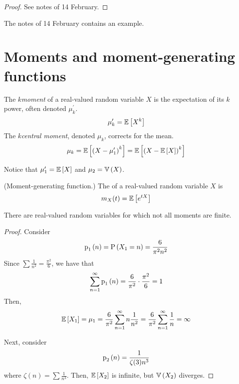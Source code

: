 \documentclass[11pt]{article}
\begin{document}
\begin{proof}
    See notes of 14 February.
\end{proof}

The notes of 14 February contains an example.

\section{Moments and moment-generating functions}

\begin{defn}
    The $k$\th \emph{moment} of a real-valued random variable $X$ is the
    expectation of its $k$\th power, often denoted $\mu_k^\prime$.
    \begin{equation*}
        \mu_k^\prime = \operatorname{\mathbb{E}}{\left[X^k\right]}
    \end{equation*}
    The $k$\th \emph{central moment}, denoted $\mu_k$, corrects for the mean.
    \begin{equation*}
        \mu_k
        = \operatorname{\mathbb{E}}{\left[\left(X - \mu_1^\prime\right)^k\right]}
        = \operatorname{\mathbb{E}}{\left[\left(X - \operatorname{\mathbb{E}}{\left[X\right]}\right)^k\right]}
    \end{equation*}
\end{defn}

\begin{rem}
    Notice that $\mu_1^\prime = \operatorname{\mathbb{E}}{\left[X\right]}$ and $\mu_2 = \operatorname{\mathbb{V}}{\left(X\right)}$.
\end{rem}

\begin{defn}{(Moment-generating function.)}
    The \emph{\mgf} of a real-valued random variable $X$ is
    \begin{equation*}
        m_X(t) = \operatorname{\mathbb{E}}{\left[e^{t X}\right]}
    \end{equation*}
\end{defn}

\begin{rem}
    There are real-valued random variables for which not all moments are
    finite.
\end{rem}

\begin{proof}
    Consider
    \begin{equation*}
        \p[1]{n} = \P{X_1 = n} = \frac{6}{\pi^2 n^2}
    \end{equation*}
    Since $\sum \frac{1}{n^2} = \frac{\pi^2}{6}$, we have that
    \begin{equation*}
        \infsum_{n=1} \p[1]{n} = \frac{6}{\pi^2} \cdot \frac{\pi^2}{6} = 1
    \end{equation*}
    Then,
    \begin{equation*}
        \operatorname{\mathbb{E}}{\left[X_1\right]}
        = \mu_1
        = \frac{6}{\pi^2} \sum^\infty_{n=1} n \frac{1}{n^2}
        = \frac{6}{\pi^2} \sum^\infty_{n=1} \frac{1}{n}
        = \infty
    \end{equation*}

    Next, consider
    \begin{equation*}
        \p[2]{n} = \frac{1}{\zeta(3) n^3}
    \end{equation*}
    where $\zeta(n) = \sum \frac{1}{n^3}$.
    Then, $\operatorname{\mathbb{E}}{\left[X_2\right]}$ is infinite, but $\operatorname{\mathbb{V}}{\left(X_2\right)}$ diverges.
\end{proof}
\end{document}
